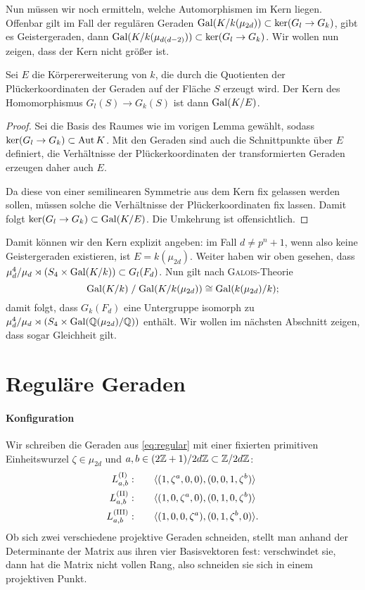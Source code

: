 Nun müssen wir noch ermitteln, welche Automorphismen im Kern liegen. Offenbar gilt im Fall der regulären Geraden $\Gal K/{k(\mu_{2d})} \subset \ker(G_l \to G_k)$, gibt es Geistergeraden, dann $\Gal K/{k(\mu_{d(d-2)})} \subset \ker(G_l \to G_k)$. Wir wollen nun zeigen, dass der Kern nicht größer ist.
\begin{lemma}
Sei $E$ die Körpererweiterung von $k$, die durch die Quotienten der Plückerkoordinaten der Geraden auf der Fläche $S$ erzeugt wird. Der Kern des Homomorphismus $G_l(S) \to G_k(S)$ ist dann $\Gal K/E$.
\end{lemma}
\begin{proof}
Sei die Basis des Raumes wie im vorigen Lemma gewählt, sodass $\ker(G_l \rightarrow G_k) \subset \operatorname{Aut} K$. Mit den Geraden sind auch die Schnittpunkte über $E$ definiert, die Verhältnisse der Plückerkoordinaten der transformierten Geraden erzeugen daher auch $E$.

Da diese von einer semilinearen Symmetrie aus dem Kern fix gelassen werden sollen, müssen solche die Verhältnisse der Plückerkoordinaten fix lassen. Damit folgt $\ker(G_l \to G_k) \subset \Gal K/E$. Die Umkehrung ist offensichtlich.
\end{proof}

Damit können wir den Kern explizit angeben: im Fall $d \neq p^n+1$, wenn also keine Geistergeraden existieren, ist $E = k(\mu_{2d})$. Weiter haben wir oben gesehen, dass $\mu_d^4 / \mu_d \rtimes (S_4 \times \Gal K/k) \subset G_l(F_d)$. Nun gilt nach \textsc{Galois}-Theorie
\begin{equation}
\Gal K/k \;/\; \Gal K/{k(\mu_{2d})} \cong \Gal k(\mu_{2d})/k;
\end{equation}
damit folgt, dass $G_k(F_d)$ eine Untergruppe isomorph zu $\mu_d^4 / \mu_d \rtimes (S_4 \times \Gal \mathbb Q(\mu_{2d})/{\mathbb Q})$ enthält. Wir wollen im nächsten Abschnitt zeigen, dass sogar Gleichheit gilt.

\section{Reguläre Geraden}
\paragraph{Konfiguration} Wir schreiben die Geraden aus \eqref{eq:regular} mit einer fixierten primitiven Einheitswurzel $\zeta \in \mu_{2d}$ und $a,b \in (2\mathbb Z + 1)/2d\mathbb Z \subset \Zmod 2dZ$:
\begin{equation}
\begin{split}
\Lcl(I)_{a,b}  :\qquad	&\langle (1,\zeta^a,0,0), (0,0,1,\zeta^b)\rangle \\
\Lcl(II)_{a,b} :\qquad	&\langle (1,0,\zeta^a,0), (0,1,0,\zeta^b)\rangle \\
\Lcl(III)_{a,b}:\qquad	&\langle (1,0,0,\zeta^a), (0,1,\zeta^b,0)\rangle.
\end{split}
\end{equation}
Ob sich zwei verschiedene projektive Geraden schneiden, stellt man anhand der Determinante der Matrix aus ihren vier Basisvektoren fest: verschwindet sie, dann hat die Matrix nicht vollen Rang, also schneiden sie sich in einem projektiven Punkt.

